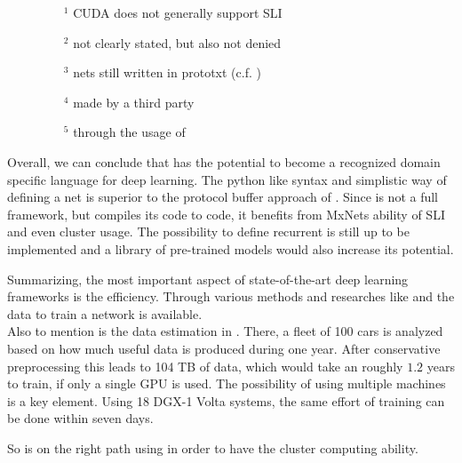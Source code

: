 \vspace{-1em}
\begin{figure}[H]
	\footnotesize
	\begin{multicols}{2}
	\begin{itemize}
		\item[$^1$] CUDA does not generally support SLI
		\item[$^2$] not clearly stated, but also not denied
		\item[$^3$] nets still written in prototxt (c.f. )
		\item[$^4$] made by a third party\cite{CaffeOnSpark}
		\item[$^5$] through the usage of \mxnet
	\end{itemize}
	\end{multicols}
\end{figure}

Overall, we can conclude that \cnnarch has the potential to become a recognized domain specific language for deep learning. The python like syntax and simplistic way of defining a net is superior to the protocol buffer approach of \caffe. Since \cnnarch is not a full framework, but compiles its code to \mxnet code, it benefits from MxNets ability of SLI and even cluster usage. The possibility to define recurrent \nns is still up to be implemented and a library of pre-trained models would also increase its potential.

Summarizing, the most important aspect of state-of-the-art deep learning frameworks is the efficiency. Through various methods and researches like \kitti and \torcs the data to train a network is available.\\
Also to mention is the data estimation in \cite{grzywaczewski2017training}. There, a fleet of 100 cars is analyzed based on how much useful data is produced during one year. After conservative preprocessing this leads to 104 TB of data, which would take an \alexnet roughly $1.2$ years to train, if only a single GPU is used. The possibility of using multiple machines is a key element. Using 18 DGX-1 Volta systems, the same effort of training can be done within seven days.

So \cnnarch is on the right path using \mxnet in order to have the cluster computing ability.


